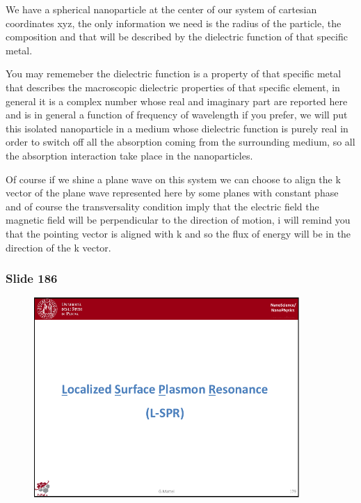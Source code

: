 \documentclass[../main/main.tex]{subfiles}
\begin{document}
We have a spherical nanoparticle at the center of our system of cartesian coordinates xyz, the only information we need is the radius of the particle, the composition and that will be described by the dielectric function of that specific metal. 

You may rememeber the dielectric function is a property of that specific metal that describes the macroscopic dielectric properties of that specific element, in general it is a complex number whose real and imaginary part are reported here and is in general a function of frequency of wavelength if you prefer, we will put this isolated nanoparticle in a medium whose dielectric function is purely real in order to switch off all the absorption coming from the surrounding medium, so all the absorption interaction take place in the nanoparticles. 

Of course if we shine a plane wave on this system we can choose to align the k vector of the plane wave represented here by some planes with constant phase and of course the transversality condition imply that the electric field the magnetic field will be perpendicular to the direction of motion, i will remind you that the pointing vector is aligned with k and so the flux of energy will be in the direction of the k vector. 

\newpage

\subsubsection{Slide 186}

\begin{figure}[h!]
\centering
\includegraphics[page=8,width=0.9\textwidth]{../lessons/pdf_file/11_lesson.pdf}
\end{figure}
\end{document}

